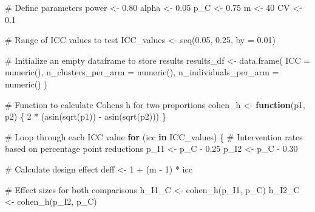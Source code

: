 \documentclass[
  letterpaper,
  DIV=11,
  numbers=noendperiod]{scrartcl}
\newenvironment{Shaded}{\begin{snugshade}}{\end{snugshade}}
\newcommand{\AttributeTok}[1]{\textcolor[rgb]{0.40,0.45,0.13}{#1}}
\newcommand{\CommentTok}[1]{\textcolor[rgb]{0.37,0.37,0.37}{#1}}
\newcommand{\ControlFlowTok}[1]{\textcolor[rgb]{0.00,0.23,0.31}{\textbf{#1}}}
\newcommand{\DecValTok}[1]{\textcolor[rgb]{0.68,0.00,0.00}{#1}}
\newcommand{\FloatTok}[1]{\textcolor[rgb]{0.68,0.00,0.00}{#1}}
\newcommand{\FunctionTok}[1]{\textcolor[rgb]{0.28,0.35,0.67}{#1}}
\newcommand{\NormalTok}[1]{\textcolor[rgb]{0.00,0.23,0.31}{#1}}
\newcommand{\OtherTok}[1]{\textcolor[rgb]{0.00,0.23,0.31}{#1}}
\newcommand{\SpecialCharTok}[1]{\textcolor[rgb]{0.37,0.37,0.37}{#1}}
\begin{document}
\begin{Shaded}
\begin{Highlighting}[]
\CommentTok{\# Define parameters}
\NormalTok{power }\OtherTok{\textless{}{-}} \FloatTok{0.80}
\NormalTok{alpha }\OtherTok{\textless{}{-}} \FloatTok{0.05}
\NormalTok{p\_C }\OtherTok{\textless{}{-}} \FloatTok{0.75} 
\NormalTok{m }\OtherTok{\textless{}{-}} \DecValTok{40}
\NormalTok{CV }\OtherTok{\textless{}{-}} \FloatTok{0.1}

\CommentTok{\# Range of ICC values to test}
\NormalTok{ICC\_values }\OtherTok{\textless{}{-}} \FunctionTok{seq}\NormalTok{(}\FloatTok{0.05}\NormalTok{, }\FloatTok{0.25}\NormalTok{, }\AttributeTok{by =} \FloatTok{0.01}\NormalTok{)}

\CommentTok{\# Initialize an empty dataframe to store results}
\NormalTok{results\_df }\OtherTok{\textless{}{-}} \FunctionTok{data.frame}\NormalTok{(}
  \AttributeTok{ICC =} \FunctionTok{numeric}\NormalTok{(),}
  \AttributeTok{n\_clusters\_per\_arm =} \FunctionTok{numeric}\NormalTok{(),}
  \AttributeTok{n\_individuals\_per\_arm =} \FunctionTok{numeric}\NormalTok{()}
\NormalTok{)}

\CommentTok{\# Function to calculate Cohen\textquotesingle{}s h for two proportions}
\NormalTok{cohen\_h }\OtherTok{\textless{}{-}} \ControlFlowTok{function}\NormalTok{(p1, p2) \{}
  \DecValTok{2} \SpecialCharTok{*}\NormalTok{ (}\FunctionTok{asin}\NormalTok{(}\FunctionTok{sqrt}\NormalTok{(p1)) }\SpecialCharTok{{-}} \FunctionTok{asin}\NormalTok{(}\FunctionTok{sqrt}\NormalTok{(p2)))}
\NormalTok{\}}

\CommentTok{\# Loop through each ICC value}
\ControlFlowTok{for}\NormalTok{ (icc }\ControlFlowTok{in}\NormalTok{ ICC\_values) \{}
  \CommentTok{\# Intervention rates based on percentage point reductions}
\NormalTok{  p\_I1 }\OtherTok{\textless{}{-}}\NormalTok{ p\_C }\SpecialCharTok{{-}} \FloatTok{0.25}
\NormalTok{  p\_I2 }\OtherTok{\textless{}{-}}\NormalTok{ p\_C }\SpecialCharTok{{-}} \FloatTok{0.30}
  
  \CommentTok{\# Calculate design effect}
\NormalTok{  deff }\OtherTok{\textless{}{-}} \DecValTok{1} \SpecialCharTok{+}\NormalTok{ (m }\SpecialCharTok{{-}} \DecValTok{1}\NormalTok{) }\SpecialCharTok{*}\NormalTok{ icc}
  
  \CommentTok{\# Effect sizes for both comparisons}
\NormalTok{  h\_I1\_C }\OtherTok{\textless{}{-}} \FunctionTok{cohen\_h}\NormalTok{(p\_I1, p\_C)}
\NormalTok{  h\_I2\_C }\OtherTok{\textless{}{-}} \FunctionTok{cohen\_h}\NormalTok{(p\_I2, p\_C)}
  

\end{Highlighting}
\end{Shaded}
\end{document}
